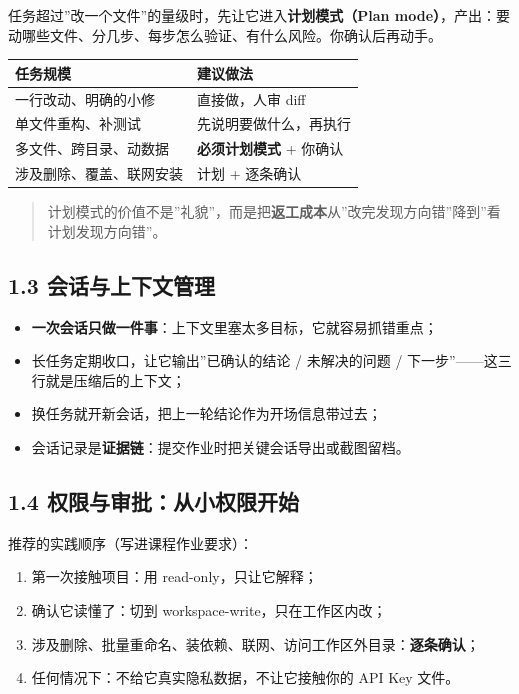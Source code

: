 任务超过''改一个文件''的量级时，先让它进入\textbf{计划模式（Plan
mode）}，产出：要动哪些文件、分几步、每步怎么验证、有什么风险。你确认后再动手。

{\def\LTcaptype{none} %
\begin{longtable}[]{@{}ll@{}}
\toprule\noalign{}
任务规模 & 建议做法 \\
\midrule\noalign{}
\endhead
\bottomrule\noalign{}
\endlastfoot
一行改动、明确的小修 & 直接做，人审 diff \\
单文件重构、补测试 & 先说明要做什么，再执行 \\
多文件、跨目录、动数据 & \textbf{必须计划模式} + 你确认 \\
涉及删除、覆盖、联网安装 & 计划 + 逐条确认 \\
\end{longtable}
}

\begin{quote}
计划模式的价值不是''礼貌''，而是把\textbf{返工成本}从''改完发现方向错''降到''看计划发现方向错''。
\end{quote}

\subsection{1.3
会话与上下文管理}\label{ux4f1aux8bddux4e0eux4e0aux4e0bux6587ux7ba1ux7406}

\begin{itemize}
\tightlist
\item
  \textbf{一次会话只做一件事}：上下文里塞太多目标，它就容易抓错重点；
\item
  长任务定期收口，让它输出''已确认的结论 / 未解决的问题 /
  下一步''------这三行就是压缩后的上下文；
\item
  换任务就开新会话，把上一轮结论作为开场信息带过去；
\item
  会话记录是\textbf{证据链}：提交作业时把关键会话导出或截图留档。
\end{itemize}

\subsection{1.4
权限与审批：从小权限开始}\label{ux6743ux9650ux4e0eux5ba1ux6279ux4eceux5c0fux6743ux9650ux5f00ux59cb}

推荐的实践顺序（写进课程作业要求）：

\begin{enumerate}
\def\labelenumi{\arabic{enumi}.}
\tightlist
\item
  第一次接触项目：用 read-only，只让它解释；
\item
  确认它读懂了：切到 workspace-write，只在工作区内改；
\item
  涉及删除、批量重命名、装依赖、联网、访问工作区外目录：\textbf{逐条确认}；
\item
  任何情况下：不给它真实隐私数据，不让它接触你的 API Key 文件。
\end{enumerate}

